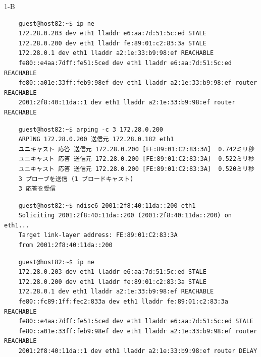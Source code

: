 \begin{maintask}{1-B}
  \begin{termout}[H]
    \caption{実行前の近隣キャッシュ}\label{out:ne_before}
    \begin{verbatim}
    guest@host82:~$ ip ne
    172.28.0.203 dev eth1 lladdr e6:aa:7d:51:5c:ed STALE
    172.28.0.200 dev eth1 lladdr fe:89:01:c2:83:3a STALE
    172.28.0.1 dev eth1 lladdr a2:1e:33:b9:98:ef REACHABLE
    fe80::e4aa:7dff:fe51:5ced dev eth1 lladdr e6:aa:7d:51:5c:ed REACHABLE
    fe80::a01e:33ff:feb9:98ef dev eth1 lladdr a2:1e:33:b9:98:ef router REACHABLE
    2001:2f8:40:11da::1 dev eth1 lladdr a2:1e:33:b9:98:ef router REACHABLE
    \end{verbatim}
  \end{termout}

  \begin{termout}[H]
    \caption{arping(IPv4) の実行結果}\label{out:arping}
    \begin{verbatim}
    guest@host82:~$ arping -c 3 172.28.0.200
    ARPING 172.28.0.200 送信元 172.28.0.182 eth1
    ユニキャスト 応答 送信元 172.28.0.200 [FE:89:01:C2:83:3A]  0.742ミリ秒
    ユニキャスト 応答 送信元 172.28.0.200 [FE:89:01:C2:83:3A]  0.522ミリ秒
    ユニキャスト 応答 送信元 172.28.0.200 [FE:89:01:C2:83:3A]  0.520ミリ秒
    3 プローブを送信 (1 ブロードキャスト)
    3 応答を受信
    \end{verbatim}
  \end{termout}

  \begin{termout}[H]
    \caption{ndisc6(IPv6) の実行結果}\label{out:ndisc6}
    \begin{verbatim}
    guest@host82:~$ ndisc6 2001:2f8:40:11da::200 eth1
    Soliciting 2001:2f8:40:11da::200 (2001:2f8:40:11da::200) on eth1...
    Target link-layer address: FE:89:01:C2:83:3A
    from 2001:2f8:40:11da::200
    \end{verbatim}
  \end{termout}

  \begin{termout}[H]
    \caption{実行後の近隣キャッシュ}\label{out:ne_after}
    \begin{verbatim}
    guest@host82:~$ ip ne
    172.28.0.203 dev eth1 lladdr e6:aa:7d:51:5c:ed STALE
    172.28.0.200 dev eth1 lladdr fe:89:01:c2:83:3a STALE
    172.28.0.1 dev eth1 lladdr a2:1e:33:b9:98:ef REACHABLE
    fe80::fc89:1ff:fec2:833a dev eth1 lladdr fe:89:01:c2:83:3a REACHABLE
    fe80::e4aa:7dff:fe51:5ced dev eth1 lladdr e6:aa:7d:51:5c:ed STALE
    fe80::a01e:33ff:feb9:98ef dev eth1 lladdr a2:1e:33:b9:98:ef router REACHABLE
    2001:2f8:40:11da::1 dev eth1 lladdr a2:1e:33:b9:98:ef router DELAY
    \end{verbatim}
  \end{termout}


\end{maintask}
